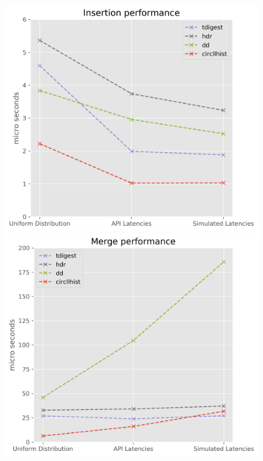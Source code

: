 \documentclass{article}
\theoremstyle{plain}
\theoremstyle{remark}
\begin{document}
\begin{figure}[t]
  \includegraphics[width=\textwidth/3]{evaluation/images/all_perf_insert.png}
  \includegraphics[width=\textwidth/3]{evaluation/images/all_perf_merge.png}

\end{figure}
\end{document}
